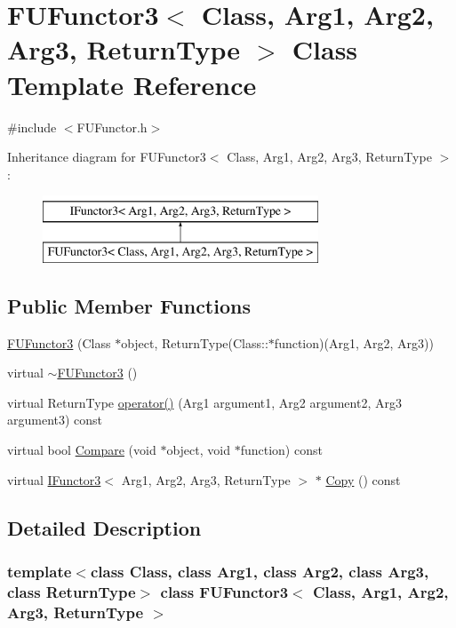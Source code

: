 \hypertarget{classFUFunctor3}{
\section{FUFunctor3$<$ Class, Arg1, Arg2, Arg3, ReturnType $>$ Class Template Reference}
\label{classFUFunctor3}
}


{\ttfamily \#include $<$FUFunctor.h$>$}

Inheritance diagram for FUFunctor3$<$ Class, Arg1, Arg2, Arg3, ReturnType $>$:\begin{figure}[H]
\begin{center}
\leavevmode
\includegraphics[height=2.000000cm]{classFUFunctor3}
\end{center}
\end{figure}
\subsection*{Public Member Functions}
\begin{DoxyCompactItemize}
\item 
\hyperlink{classFUFunctor3_af3cc0684b67ec1243c7dff071b47c76b}{FUFunctor3} (Class $\ast$object, ReturnType(Class::$\ast$function)(Arg1, Arg2, Arg3))
\item 
virtual \hyperlink{classFUFunctor3_ad540060948632e7c5862612aab2fd99d}{$\sim$FUFunctor3} ()
\item 
virtual ReturnType \hyperlink{classFUFunctor3_a7b253fc6a8983af28bbc852c8b07c63f}{operator()} (Arg1 argument1, Arg2 argument2, Arg3 argument3) const 
\item 
virtual bool \hyperlink{classFUFunctor3_a28cbfa159cb56cd0bce95014dacd5add}{Compare} (void $\ast$object, void $\ast$function) const 
\item 
virtual \hyperlink{classIFunctor3}{IFunctor3}$<$ Arg1, Arg2, Arg3, ReturnType $>$ $\ast$ \hyperlink{classFUFunctor3_a8ecff24a7bfb487bd8024b35cc3b00ca}{Copy} () const 
\end{DoxyCompactItemize}


\subsection{Detailed Description}
\subsubsection*{template$<$class Class, class Arg1, class Arg2, class Arg3, class ReturnType$>$ class FUFunctor3$<$ Class, Arg1, Arg2, Arg3, ReturnType $>$}

